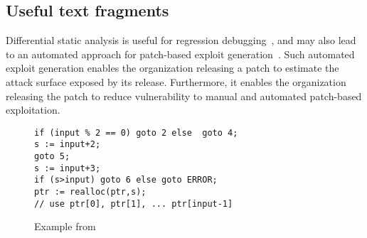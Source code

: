 \subsection{Useful text fragments}

Differential static analysis is useful for regression debugging~\cite{TODO}, and may also lead to an automated approach for patch-based exploit generation~\cite{TODO}. Such automated exploit generation enables the organization releasing a patch to estimate the attack surface exposed by its release. Furthermore, it enables the organization releasing the patch to reduce vulnerability to manual and automated patch-based exploitation.


\begin{figure}
\begin{lstlisting}
if (input % 2 == 0) goto 2 else  goto 4;
s := input+2;
goto 5;
s := input+3;
if (s>input) goto 6 else goto ERROR;
ptr := realloc(ptr,s);
// use ptr[0], ptr[1], ... ptr[input-1]
\end{lstlisting}
\caption{Example from \cite{TODO}}
\end{figure} 